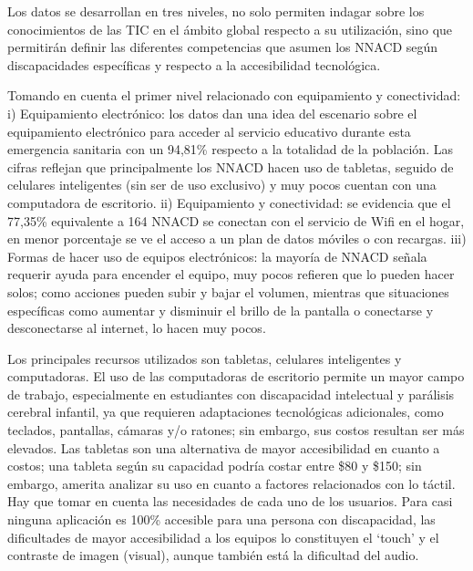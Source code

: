 \documentclass[spanish]{textolivre}
\begin{document}
Los datos se desarrollan en tres niveles, no solo permiten indagar sobre los conocimientos de las TIC en el ámbito global respecto a su utilización, sino que permitirán definir las diferentes competencias que asumen los NNACD según discapacidades específicas y respecto a la accesibilidad tecnológica.

Tomando en cuenta el primer nivel relacionado con equipamiento y conectividad: i) Equipamiento electrónico: los datos dan una idea del escenario sobre el equipamiento electrónico para acceder al servicio educativo durante esta emergencia sanitaria con un 94,81\% respecto a la totalidad de la población. Las cifras reflejan que principalmente los NNACD hacen uso de tabletas, seguido de celulares inteligentes (sin ser de uso exclusivo) y muy pocos cuentan con una computadora de escritorio. ii) Equipamiento y conectividad: se evidencia que el 77,35\% equivalente a 164 NNACD se conectan con el servicio de Wifi en el hogar, en menor porcentaje se ve el acceso a un plan de datos móviles o con recargas. iii) Formas de hacer uso de equipos electrónicos: la mayoría de NNACD señala requerir ayuda para encender el equipo, muy pocos refieren que lo pueden hacer solos; como acciones pueden subir y bajar el volumen, mientras que situaciones específicas como aumentar y disminuir el brillo de la pantalla o conectarse y desconectarse al internet, lo hacen muy pocos.

Los principales recursos utilizados son tabletas, celulares inteligentes y computadoras. El uso de las computadoras de escritorio permite un mayor campo de trabajo, especialmente en estudiantes con discapacidad intelectual y parálisis cerebral infantil, ya que requieren adaptaciones tecnológicas adicionales, como teclados, pantallas, cámaras y/o ratones; sin embargo, sus costos resultan ser más elevados. Las tabletas son una alternativa de mayor accesibilidad en cuanto a costos; una tableta según su capacidad podría costar entre \$80 y \$150; sin embargo, amerita analizar su uso en cuanto a factores relacionados con lo táctil. Hay que tomar en cuenta las necesidades de cada uno de los usuarios. Para \textcite{acosta-vargas_accessibility_2021} casi ninguna aplicación es 100\% accesible para una persona con discapacidad, las dificultades de mayor accesibilidad a los equipos lo constituyen el ‘touch’ y el contraste de imagen (visual), aunque también está la dificultad del audio.
\end{document}
